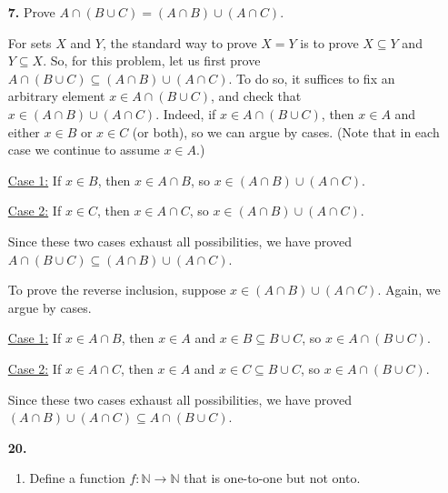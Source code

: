 \documentclass[12pt,reqno]{amsart}
\begin{document}
\begin{enumerate}[{\bf 1.}]
 
\item[{\bf 7.}]
Prove $A \cap (B \cup C) = (A \cap B) \cup (A \cap C)$.
\bigskip

For sets $X$ and $Y$, the standard way to prove $X = Y$ 
is to prove $X \subseteq Y$ and $Y \subseteq X$.
So, for this problem, let us first prove
$A \cap (B \cup C) \subseteq (A \cap B) \cup (A \cap C)$.
To do so, it suffices to fix an arbitrary element $x \in A \cap (B \cup C)$,
and check that 
$x \in (A \cap B) \cup (A \cap C)$.
Indeed, if $x \in A \cap (B \cup C)$, then $x\in A$ and 
either $x\in B$ or $x \in C$ (or both), so we can argue by cases. (Note that in each case
we continue to assume $x \in A$.)

\medskip

\underline{Case 1:} If $x\in B$, then $x \in A\cap B$, so 
$x \in (A \cap B) \cup (A \cap C)$.

\medskip

\underline{Case 2:} If $x\in C$, then $x \in A\cap C$, so 
$x \in (A \cap B) \cup (A \cap C)$.

\medskip

\noindent Since these two cases exhaust all possibilities, we have proved
$A \cap (B \cup C) \subseteq (A \cap B) \cup (A \cap C)$.

\medskip

\noindent To prove the reverse inclusion, suppose 
$x\in (A \cap B) \cup (A \cap C)$.  Again, we argue by cases.


\medskip

\underline{Case 1:} If $x\in A \cap B$, then $x \in A$ and 
$x \in B \subseteq B\cup C$, so $x \in A \cap (B\cup C)$.

\medskip

\underline{Case 2:} If $x\in A \cap C$, then $x \in A$ and 
$x \in C \subseteq B\cup C$, so $x \in A \cap (B\cup C)$.


\medskip

\noindent Since these two cases exhaust all possibilities, we have proved
$(A \cap B) \cup (A \cap C) \subseteq A \cap (B \cup C)$.

\bigskip
 

\bigskip

\item[{\bf 20.}]
\begin{enumerate}
  
\item
Define a function $f: {\mathbb N} \rightarrow {\mathbb N}$ that is one-to-one but not onto. 
 

\end{enumerate}
\end{enumerate}
\end{document}
